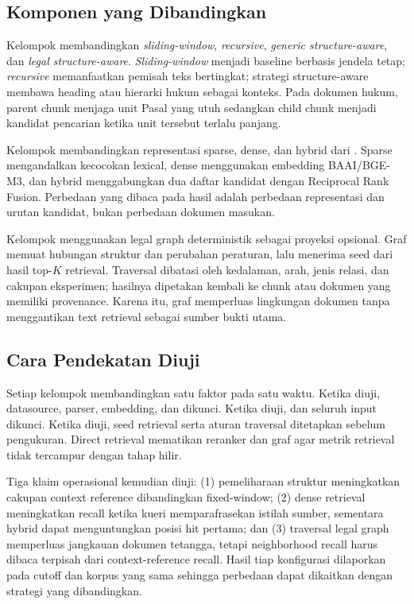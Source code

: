 \subsection{Komponen yang Dibandingkan}

Kelompok \chunker membandingkan \textit{sliding-window}, \textit{recursive}, \textit{generic structure-aware}, dan \textit{legal structure-aware}. \textit{Sliding-window} menjadi baseline berbasis jendela tetap; \textit{recursive} memanfaatkan pemisah teks bertingkat; strategi structure-aware membawa heading atau hierarki hukum sebagai konteks. Pada dokumen hukum, parent chunk menjaga unit Pasal yang utuh sedangkan child chunk menjadi kandidat pencarian ketika unit tersebut terlalu panjang.

Kelompok \indexer membandingkan representasi sparse, dense, dan hybrid dari . Sparse mengandalkan kecocokan lexical, dense menggunakan embedding BAAI/BGE-M3, dan hybrid menggabungkan dua daftar kandidat dengan Reciprocal Rank Fusion. Perbedaan yang dibaca pada hasil adalah perbedaan representasi dan urutan kandidat, bukan perbedaan dokumen masukan.

Kelompok \kg menggunakan legal graph deterministik sebagai proyeksi opsional. Graf memuat hubungan struktur dan perubahan peraturan, lalu menerima seed dari hasil top-$K$ retrieval. Traversal dibatasi oleh kedalaman, arah, jenis relasi, dan cakupan eksperimen; hasilnya dipetakan kembali ke chunk atau dokumen yang memiliki provenance. Karena itu, graf memperluas lingkungan dokumen tanpa menggantikan text retrieval sebagai sumber bukti utama.

\subsection{Cara Pendekatan Diuji}

Setiap kelompok membandingkan satu faktor pada satu waktu. Ketika \chunker diuji, datasource, parser, embedding, dan \indexer dikunci. Ketika \indexer diuji, \chunker dan seluruh input dikunci. Ketika \kg diuji, seed retrieval serta aturan traversal ditetapkan sebelum pengukuran. Direct retrieval mematikan reranker dan graf agar metrik retrieval tidak tercampur dengan tahap hilir.

Tiga klaim operasional kemudian diuji: (1) pemeliharaan struktur meningkatkan cakupan context reference dibandingkan fixed-window; (2) dense retrieval meningkatkan recall ketika kueri memparafrasekan istilah sumber, sementara hybrid dapat menguntungkan posisi hit pertama; dan (3) traversal legal graph memperluas jangkauan dokumen tetangga, tetapi neighborhood recall harus dibaca terpisah dari context-reference recall. Hasil tiap konfigurasi dilaporkan pada cutoff dan korpus yang sama sehingga perbedaan dapat dikaitkan dengan strategi yang dibandingkan.
